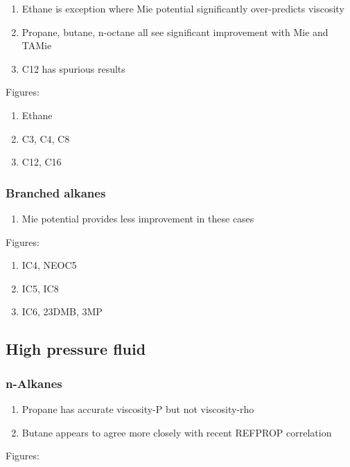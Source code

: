 \documentclass[11pt,a4paper]{article}
\begin{document}
\begin{enumerate}
	\item Ethane is exception where Mie potential significantly over-predicts viscosity
	\item Propane, butane, n-octane all see significant improvement with Mie and TAMie
	\item C12 has spurious results
\end{enumerate}

Figures:

\begin{enumerate}
	\item Ethane
	\item C3, C4, C8
	\item C12, C16
\end{enumerate}

\subsubsection{Branched alkanes}

\begin{enumerate}
	\item Mie potential provides less improvement in these cases
\end{enumerate}

Figures:

\begin{enumerate}
	\item IC4, NEOC5
	\item IC5, IC8
	\item IC6, 23DMB, 3MP
\end{enumerate}

\subsection{High pressure fluid}

\subsubsection{n-Alkanes}

\begin{enumerate}
	\item Propane has accurate viscosity-P but not viscosity-rho
	\item Butane appears to agree more closely with recent REFPROP correlation
\end{enumerate}

Figures:
\end{document}
